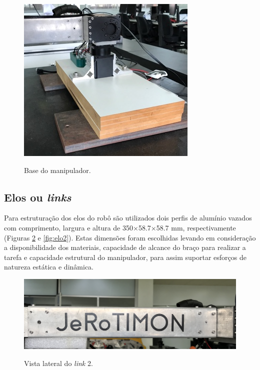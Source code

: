 \begin{figure}[H]
    \centering
    \caption{Base do manipulador.}
    \includegraphics[scale=3]{images/base.png}
    \label{fig:base}
\end{figure}


\subsection{Elos ou \textit{links}}
Para estruturação dos elos do robô são utilizados dois perfis de alumínio vazados com comprimento, largura e altura de 350$\times$58.7$\times$58.7 mm, respectivamente (Figuras \ref{fig:elo1} e \ref{fig:elo2}). Estas dimensões foram escolhidas levando em consideração a disponibilidade dos materiais, capacidade de alcance do braço para realizar a tarefa e capacidade estrutural do manipulador, para assim suportar esforços de natureza estática e dinâmica. 

\begin{figure}[H]
    \centering
    \caption{Vista lateral do \textit{link} 2.}
    \includegraphics[scale=0.1]{images/elo1.png}
    \label{fig:elo1}
\end{figure}

